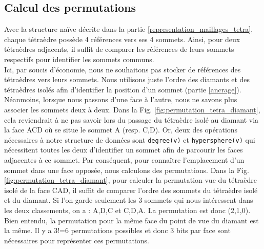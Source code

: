 \subsection{Calcul des permutations}
\noindent
Avec la structure naïve décrite dans la partie \ref{representation_maillages_tetra}, chaque tétraèdre possède 4 références vers ses 4 sommets. Ainsi, pour deux tétraèdres adjacents, il suffit de comparer les références de leurs sommets respectifs pour identifier les sommets communs.\\
Ici, par soucis d'économie, nous ne souhaitons pas stocker de références des tétraèdres vers leurs sommets. Nous utilisons juste l'ordre des diamants et des tétraèdres isolés afin d'identifier la position d'un sommet (partie \ref{ancrage}).\\
Néanmoins, lorsque nous passons d'une face à l'autre, nous ne savons plus associer les sommets deux à deux. Dans la Fig. \ref{fig:permutation_tetra_diamant}, cela reviendrait à ne pas savoir lors du passage du tétraèdre isolé au diamant via la face ACD où se situe le sommet A (resp. C,D). Or, deux des opérations nécessaires à notre structure de données sont \texttt{degree(v)} et \texttt{hypersphere(v)} qui nécessitent toutes les deux d'identifier un sommet afin de parcourir les faces adjacentes à ce sommet. Par conséquent, pour connaître l'emplacement d'un sommet dans une face opposée, nous calculons des permutations.
Dans la Fig. \ref{fig:permutation_tetra_diamant}, pour calculer la permutation vue du tétraèdre isolé de la face CAD, il suffit de comparer l'ordre des sommets du tétraèdre isolé et du diamant. Si l'on garde seulement les 3 sommets qui nous intéressent dans les deux classements, on a : A,D,C et C,D,A. La permutation est donc (2,1,0). Bien entendu, la permutation pour la même face du point de vue du diamant est la même. Il y a 3!=6 permutations possibles et donc 3 bits par face sont nécessaires pour représenter ces permutations.


